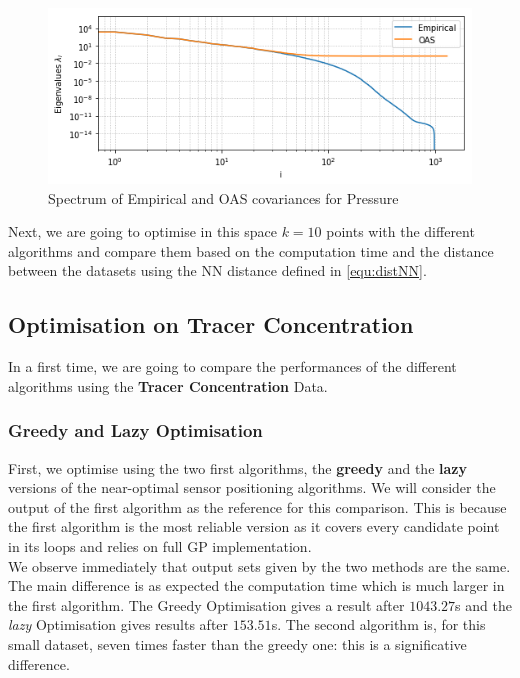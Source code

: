 \begin{figure}[h!]
\centering
    \includegraphics[width=0.7\linewidth]{figures/CompAlg/cov_emp_oas_log}
    \caption{Spectrum of Empirical and OAS covariances for Pressure}
    \label{fig:small_cov_eig:pressure}
\end{figure}

Next, we are going to optimise in this space $k=10$ points with the different algorithms and compare them based on the computation time and the distance between the datasets using the NN distance defined in \ref{equ:distNN}. 

\subsection{Optimisation on Tracer Concentration}
In a first time, we are going to compare the performances of the different algorithms using the \textbf{Tracer Concentration} Data. 


\subsubsection{Greedy and Lazy Optimisation}

First, we optimise using the two first algorithms, the \textbf{greedy} and the \textbf{lazy} versions of the near-optimal sensor positioning algorithms. We will consider the output of the first algorithm as the reference for this comparison. This is because the first algorithm is the most reliable version as it covers every candidate point in its loops and relies on full GP implementation.  \\


We observe immediately that output sets given by the two methods are the same. The main difference is as expected the computation time which is much larger in the first algorithm. The Greedy Optimisation gives a result after $1043.27$s and the \textit{lazy} Optimisation gives results after $153.51 $s. The second algorithm is, for this small dataset, seven times faster than the greedy one: this is a significative difference. \\ 

